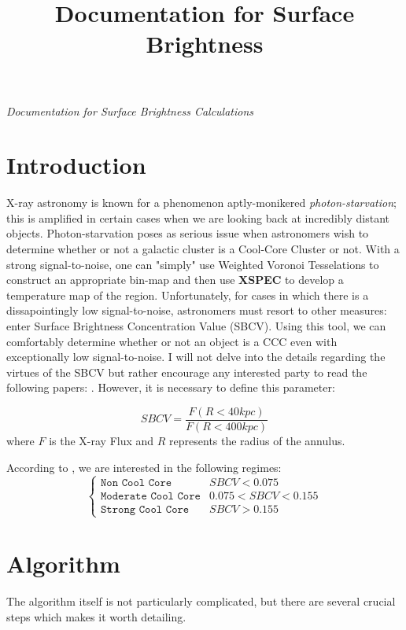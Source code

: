 \documentclass[11pt,letterpaper]{article}
\begin{document}
	\univlogo
	
	\title{Documentation for Surface Brightness}
	
	\textit{Documentation for Surface Brightness Calculations}
	
	\tableofcontents
	
	\newpage
	
	
	\newpage
\section{Introduction}
X-ray astronomy is known for a phenomenon aptly-monikered \textit{photon-starvation}; this is amplified in certain cases when we are looking back at incredibly distant objects. Photon-starvation poses as serious issue when astronomers wish to determine whether or not a galactic cluster is a Cool-Core Cluster or not. With a strong signal-to-noise, one can "simply" use Weighted Voronoi Tesselations to construct an appropriate bin-map and then use \textbf{XSPEC} to develop a temperature map of the region. Unfortunately, for cases in which there is a dissapointingly low signal-to-noise, astronomers must resort to other measures: enter Surface Brightness Concentration Value (SBCV). Using this tool, we can comfortably determine whether or not an object is a CCC even with exceptionally low signal-to-noise. I will not delve into the details regarding the virtues of the SBCV but rather encourage any interested party to read the following papers: \cite{Santos2018} \cite{Santos2018a} \cite{Semler2012}. However, it is necessary to define this parameter:

\begin{equation}
	SBCV = \frac{F(R<40kpc)}{F(R<400kpc)}
\end{equation}
where $F$ is the X-ray Flux and $R$ represents the radius of the annulus.

According to \cite{Semler2012}, we are interested in the following regimes:
\[ \begin{cases} 
\texttt{Non Cool Core} & SBCV < 0.075 \\
\texttt{Moderate Cool Core} & 0.075 < SBCV < 0.155 \\
\texttt{Strong Cool Core} & SBCV > 0.155 
\end{cases}
\] 

\section{Algorithm}
The algorithm itself is not particularly complicated, but there are several crucial steps which makes it worth detailing.
\end{document}
